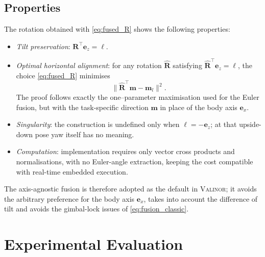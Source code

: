 \documentclass{IJCAS}
\begin{document}
\subsection{Properties}

The rotation obtained with \eqref{eq:fused_R} shows the following
properties:

\begin{itemize}
  \item \emph{Tilt preservation}:  
        \(\boldsymbol{R}^{\top}\boldsymbol{e}_{z}=\boldsymbol{\ell}\).

  \item \emph{Optimal horizontal alignment}:  
        for any rotation \(\hat{\boldsymbol{R}}\) satisfying
        \(\hat{\boldsymbol{R}}^{\top}\boldsymbol{e}_{z}=\boldsymbol{\ell}\),
        the choice \eqref{eq:fused_R} minimises
        \[
          \bigl\|
             \hat{\boldsymbol{R}}^{\top}\boldsymbol{m}-\boldsymbol{m}_{l}
          \bigr\|^{2}.
        \]
        The proof follows exactly the one–parameter maximisation used
        for the Euler fusion, but with the task-specific direction
        \(\boldsymbol{m}\) in place of the body axis
        \(\boldsymbol{e}_{x}\).

  \item \emph{Singularity}:  
        the construction is undefined only when
        \(\boldsymbol{\ell}=-\boldsymbol{e}_{z}\); at that upside-down
        pose yaw itself has no meaning.

  \item \emph{Computation}:  
        implementation requires only vector cross products and
        normalisations, with no Euler-angle extraction, keeping the cost
        compatible with real-time embedded execution.
\end{itemize}

The axis-agnostic fusion is therefore adopted as the default in {\scshape Valinor}; it avoids the arbitrary preference for the body axis \(\boldsymbol{e}_{x}\), takes into account the difference of tilt and avoids the gimbal-lock issues of \eqref{eq:fusion_classic}. 





\section{Experimental Evaluation}~\label{sec:exps}
\end{document}
